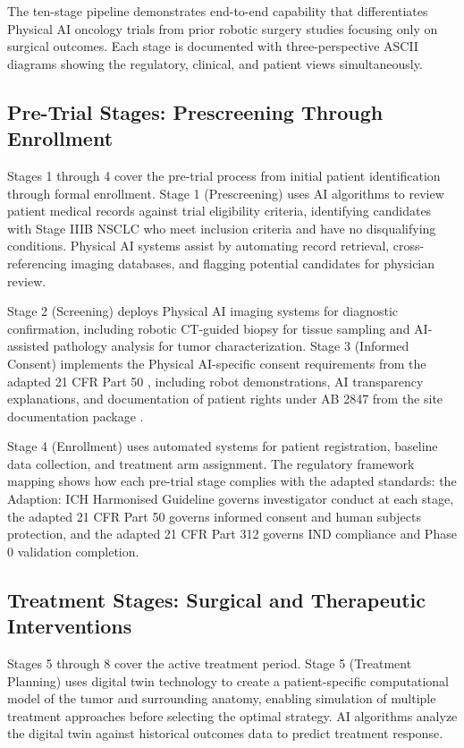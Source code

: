 The ten-stage pipeline demonstrates end-to-end capability that differentiates
Physical AI oncology trials from prior robotic surgery studies focusing only on
surgical outcomes. Each stage is documented with three-perspective ASCII
diagrams showing the regulatory, clinical, and patient views simultaneously.

\subsection{Pre-Trial Stages: Prescreening Through Enrollment}
\label{subsec:journey-pretrial}

Stages 1 through 4 cover the pre-trial process from initial patient
identification through formal enrollment. Stage 1 (Prescreening) uses AI
algorithms to review patient medical records against trial eligibility
criteria, identifying candidates with Stage IIIB NSCLC who meet inclusion
criteria and have no disqualifying conditions. Physical AI systems assist by
automating record retrieval, cross-referencing imaging databases, and flagging
potential candidates for physician review.

Stage 2 (Screening) deploys Physical AI imaging systems for diagnostic
confirmation, including robotic CT-guided biopsy for tissue sampling and
AI-assisted pathology analysis for tumor characterization. Stage 3 (Informed
Consent) implements the Physical AI-specific consent requirements from the
adapted 21 CFR Part 50 \cite{cfr50-adapt}, including robot demonstrations,
AI transparency explanations, and documentation of patient rights under
AB 2847 from the site documentation package \cite{site-docs}.

Stage 4 (Enrollment) uses automated systems for patient registration, baseline
data collection, and treatment arm assignment. The regulatory framework mapping
shows how each pre-trial stage complies with the adapted standards: the
Adaption: ICH Harmonised Guideline \cite{ich-adapt} governs investigator
conduct at each stage, the adapted 21 CFR Part 50 governs informed consent and
human subjects protection, and the adapted 21 CFR Part 312 \cite{cfr312-adapt}
governs IND compliance and Phase 0 validation completion.

\subsection{Treatment Stages: Surgical and Therapeutic Interventions}
\label{subsec:journey-treatment}

Stages 5 through 8 cover the active treatment period. Stage 5 (Treatment
Planning) uses digital twin technology to create a patient-specific
computational model of the tumor and surrounding anatomy, enabling simulation
of multiple treatment approaches before selecting the optimal strategy. AI
algorithms analyze the digital twin against historical outcomes data to predict
treatment response.


